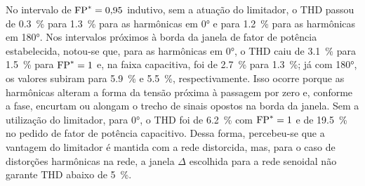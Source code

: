 No intervalo de $\mathrm{FP}^*=0{,}95$ indutivo, sem a atuação do limitador, o THD passou de \SI{0,3}{\percent} para \SI{1,3}{\percent} para as harmônicas em \ang{0} e para \SI{1,2}{\percent} para as harmônicas
em \ang{180}. Nos intervalos próximos à borda da janela de fator de potência estabelecida, notou-se que, para as harmônicas em \ang{0}, o THD caiu de \SI{3,1}{\percent} para \SI{1,5}{\percent} para $\mathrm{FP}^*=1$
e, na faixa capacitiva, foi de \SI{2,7}{\percent} para \SI{1,3}{\percent}; já com \ang{180}, os valores subiram para \SI{5,9}{\percent} e \SI{5,5}{\percent}, respectivamente. Isso ocorre porque as harmônicas
alteram a forma da tensão próxima à passagem por zero e, conforme a fase, encurtam ou alongam o trecho de sinais opostos na borda da janela. Sem a utilização do limitador,
para \ang{0}, o THD foi de \SI{6,2}{\percent} com $\mathrm{FP}^*=1$ e de \SI{19,5}{\percent} no pedido de fator de potência capacitivo. Dessa forma, percebeu-se que a vantagem do limitador
é mantida com a rede distorcida, mas, para o caso de distorções harmônicas na rede, a janela $\Delta$ escolhida para a rede senoidal não garante THD abaixo de
\SI{5}{\percent}.

